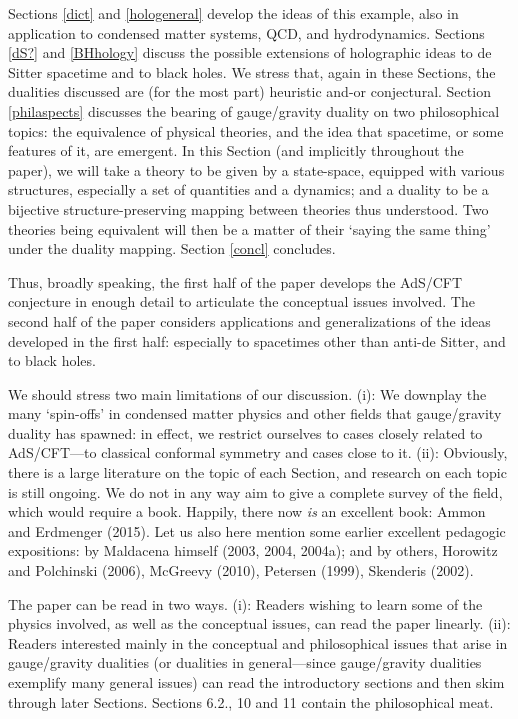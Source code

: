 \documentclass[12pt]{article}
\renewcommand{\^}[1]{\hat{#1}}
\begin{document}
 Sections \ref{dict} and \ref{hologeneral} develop the ideas of this example, also in application to condensed matter systems, QCD, and hydrodynamics. Sections \ref{dS?} and \ref{BHhology} discuss the possible extensions of holographic ideas to de Sitter spacetime and to black holes. We stress that, again in these Sections, the dualities discussed are (for the most part)  heuristic and-or conjectural.  Section \ref{philaspects} discusses the bearing of gauge/gravity duality on two philosophical topics: the equivalence of physical theories, and the idea that spacetime, or some features of it, are emergent. In this Section (and implicitly throughout the paper), we will take a theory to be given by a state-space, equipped with various structures, especially a set of quantities and a dynamics; and a duality to be a bijective structure-preserving mapping between theories thus understood. Two theories being equivalent will then be a matter of their `saying the same thing' under the duality mapping. Section \ref{concl} concludes. 

Thus, broadly speaking, the first half of the paper develops the AdS/CFT conjecture in enough detail to articulate the conceptual issues involved. The second half of the paper considers applications and generalizations of the ideas developed in the first half: especially to spacetimes other than anti-de Sitter,  and to black holes. 

We should stress two main limitations of our discussion. (i): We downplay the many `spin-offs' in condensed matter physics and other fields that gauge/gravity duality has spawned: in effect, we restrict ourselves to cases closely related to AdS/CFT---to classical conformal symmetry and cases close to it.  (ii): Obviously, there is a large literature on the topic of each Section, and  research on each topic is still ongoing. We do not in any way aim to give a complete survey of the field, which would require a book. Happily, there now {\em is} an excellent book: Ammon and Erdmenger (2015). Let us also here mention some earlier excellent pedagogic expositions: by Maldacena himself (2003, 2004, 2004a); and by others, Horowitz and Polchinski (2006), McGreevy (2010), Petersen (1999), Skenderis (2002).

The paper can be read in two ways. (i): Readers wishing to learn some of the physics involved,  as well as the conceptual issues, can read the paper linearly. (ii): Readers interested mainly in the conceptual and philosophical issues that arise in gauge/gravity dualities (or dualities in general---since gauge/gravity dualities exemplify many general issues) can read the introductory sections and then skim through later Sections. Sections 6.2., 10 and 11 contain the philosophical meat.
\end{document}
